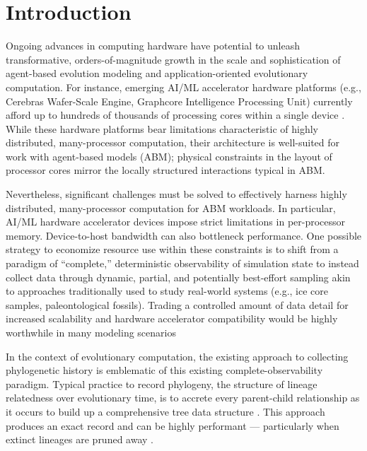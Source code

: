 \section{Introduction} \label{sec:introduction}

Ongoing advances in computing hardware have potential to unleash transformative, orders-of-magnitude growth in the scale and sophistication of agent-based evolution modeling and application-oriented evolutionary computation.
For instance, emerging AI/ML accelerator hardware platforms (e.g., Cerebras Wafer-Scale Engine, Graphcore Intelligence Processing Unit) currently afford up to hundreds of thousands of processing cores within a single device \citep{lauterbach2021path,jia2019dissecting}.
While these hardware platforms bear limitations characteristic of highly distributed, many-processor computation, their architecture is well-suited for work with agent-based models (ABM); physical constraints in the layout of processor cores mirror the locally structured interactions typical in ABM.

Nevertheless, significant challenges must be solved to effectively harness highly distributed, many-processor computation for ABM workloads.
In particular, AI/ML hardware accelerator devices impose strict limitations in per-processor memory.
Device-to-host bandwidth can also bottleneck performance.
One possible strategy to economize resource use within these constraints is to shift from a paradigm of ``complete,'' deterministic observability of simulation state to instead collect data through dynamic, partial, and potentially best-effort sampling akin to approaches traditionally used to study real-world systems (e.g., ice core samples, paleontological fossils).
Trading a controlled amount of data detail for increased scalability and hardware accelerator compatibility would be highly worthwhile in many modeling scenarios

In the context of evolutionary computation, the existing approach to collecting phylogenetic history is emblematic of this existing complete-observability paradigm.
Typical practice to record phylogeny, the structure of lineage relatedness over evolutionary time, is to accrete every parent-child relationship as it occurs to build up a comprehensive tree data structure \citep{moreno2024algorithms}.
This approach produces an exact record and can be highly performant --- particularly when extinct lineages are pruned away \citep{dolson2024phylotrackpy}.

